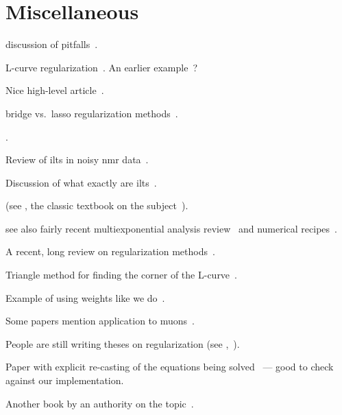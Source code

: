\section{Miscellaneous \label{sec:miscellaneous}}

discussion of pitfalls~\cite{1983-Varah-SIAMJSSC-4-164}.

L-curve regularization~\cite{1992-Hansen-SIAMR-34-561, 1993-Hansen-SIAMJSC-14-1487}.
An earlier example~\cite{1990-Hansen-SIAMJSSC-11-503}?

Nice high-level article~\cite{1994-Craig-CP-8-648}.

bridge vs.\ lasso regularization methods~\cite{1998-Wenjiang-JCGS-7-397}.

\cite{2002-Venkataramanan-IEEETSP-50-1017}.

Review of \glspl{ilt} in noisy \gls{nmr} data~\cite{2013-Berman-CMRPA-42-72}.

Discussion of what exactly are \glspl{ilt}~\cite{2017-Fordham-DF-29-2}.

(see , the classic textbook on the subject~\cite{1995-Lawson-SLSP}).

see also fairly recent multiexponential analysis review~\cite{1999-Istratov-RSI-70-1233} and numerical recipes~\cite{numerical-recipies}.

A recent, long review on regularization methods~\cite{2018-Benning-AN-27-1}.

Triangle method for finding the corner of the L-curve~\cite{2002-Castellanos-ANM-43-359}.

Example of using weights like we do~\cite{1999-Dunn-JMR-140-153}.

Some papers mention application to muons~\cite{1984-Honig-JCAM-10-113}.

People are still writing theses on regularization (see ,~\cite{2011-OrozcoRodriguez-PhD}).

Paper with explicit re-casting of the equations being solved~\cite{2001-OLeary-SIAMJSC-23-1161} --- good to check against our implementation.

Another book by an authority on the topic~\cite{1998-Hansen-RDDIPP}.